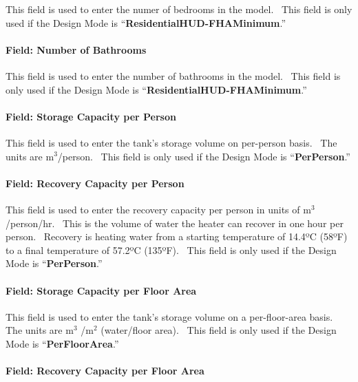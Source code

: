 This field is used to enter the numer of bedrooms in the model.~ This field is only used if the Design Mode is ``\textbf{ResidentialHUD-FHAMinimum}.''

\paragraph{Field: Number of Bathrooms}\label{field-number-of-bathrooms}

This field is used to enter the number of bathrooms in the model.~ This field is only used if the Design Mode is ``\textbf{ResidentialHUD-FHAMinimum}.''

\paragraph{Field: Storage Capacity per Person}\label{field-storage-capacity-per-person}

This field is used to enter the tank's storage volume on per-person basis.~ The units are m\(^{3}\)/person.~ This field is only used if the Design Mode is ``\textbf{PerPerson}.''

\paragraph{Field: Recovery Capacity per Person}\label{field-recovery-capacity-per-person}

This field is used to enter the recovery capacity per person in units of m\(^{3}\)/person/hr.~ This is the volume of water the heater can recover in one hour per person.~ Recovery is heating water from a starting temperature of 14.4ºC (58ºF) to a final temperature of 57.2ºC (135ºF).~ This field is only used if the Design Mode is ``\textbf{PerPerson}.''

\paragraph{Field: Storage Capacity per Floor Area}\label{field-storage-capacity-per-floor-area}

This field is used to enter the tank's storage volume on a per-floor-area basis.~ The units are m\(^{3}\) /m\(^{2}\) (water/floor area).~ This field is only used if the Design Mode is ``\textbf{PerFloorArea}.''

\paragraph{Field: Recovery Capacity per Floor Area}\label{field-recovery-capacity-per-floor-area}

